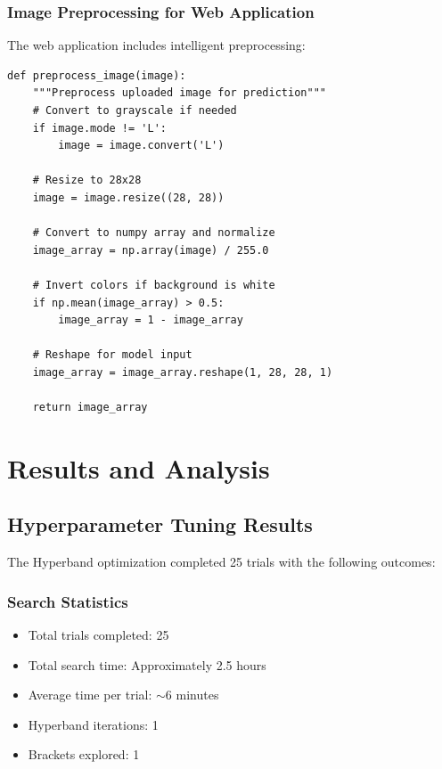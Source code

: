 \documentclass[12pt,a4paper]{article}
\begin{document}
\subsubsection{Image Preprocessing for Web Application}
The web application includes intelligent preprocessing:

\begin{lstlisting}[caption={Web Application Image Preprocessing}]
def preprocess_image(image):
    """Preprocess uploaded image for prediction"""
    # Convert to grayscale if needed
    if image.mode != 'L':
        image = image.convert('L')
    
    # Resize to 28x28
    image = image.resize((28, 28))
    
    # Convert to numpy array and normalize
    image_array = np.array(image) / 255.0
    
    # Invert colors if background is white
    if np.mean(image_array) > 0.5:
        image_array = 1 - image_array
    
    # Reshape for model input
    image_array = image_array.reshape(1, 28, 28, 1)
    
    return image_array
\end{lstlisting}

\section{Results and Analysis}

\subsection{Hyperparameter Tuning Results}

The Hyperband optimization completed 25 trials with the following outcomes:

\subsubsection{Search Statistics}
\begin{itemize}
    \item Total trials completed: 25
    \item Total search time: Approximately 2.5 hours
    \item Average time per trial: $\sim$6 minutes
    \item Hyperband iterations: 1
    \item Brackets explored: 1
\end{itemize}
\end{document}
